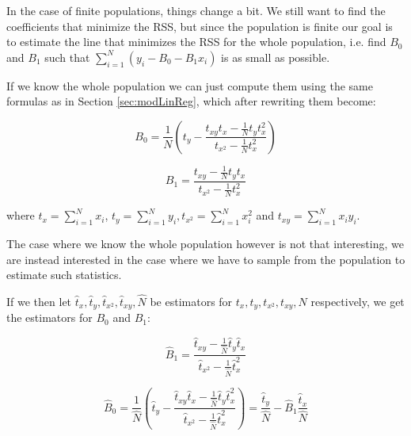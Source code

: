 \documentclass{article}
\begin{document}
In the case of finite populations, things change a bit. We still want to find the
coefficients that minimize the RSS, but since the population is finite our goal
is to estimate the line that minimizes the RSS for the whole population, i.e. find
\(B_0\) and \(B_1\) such that \(\sum_{i = 1}^N (y_i - B_0 - B_1 x_i)\) is as small as
possible.

If we know the whole population we can just compute them using the same formulas
as in Section \ref{sec:modLinReg}, which after rewriting them become:

\begin{equation*}
  B_0 = \frac{1}{N} \left( t_y - \frac{t_{xy} t_x - \frac{1}{N} t_y t_x^2}
    {t_{x^2} - \frac{1}{N} t_x^2}
   \right)
\end{equation*}

\begin{equation*}
  B_1 = \frac{t_{xy} - \frac{1}{N} t_y t_x}
    {t_{x^2} - \frac{1}{N} t_x^2}
\end{equation*}

where \(t_x = \sum_{i = 1}^N x_i\), \(t_y = \sum_{i = 1}^N y_i, t_{x^2} =
\sum_{i = 1}^N x_i^2\) and \(t_{xy} =
\sum_{i = 1}^N x_i y_i\).


The case where we know the whole population however is not that interesting, we are instead interested in the case where we have to sample from the
population to estimate such statistics.

If we then let \(\hat{t}_x, \hat{t}_y, \hat{t}_{x^2}, \hat{t}_{xy}, \hat{N}\) be estimators
for \(t_x, t_y, t_{x^2},
t_{xy}, N\) respectively, we get the estimators for \(B_0\) and \(B_1\):

\begin{equation*}
  \hat{B}_1 = \frac{\hat{t}_{xy} - \frac{1}{\widehat{N}} \hat{t}_y \hat{t}_x}
    {\hat{t}_{x^2} - \frac{1}{\widehat{N}} \hat{t}_x^2}
\end{equation*}

\begin{equation*}
  \hat{B}_0 = \frac{1}{\widehat{N}} \left( \hat{t}_y - \frac{\hat{t}_{xy} \hat{t}_x - \frac{1}{\widehat{N}} \hat{t}_y \hat{t}_x^2}
    {\hat{t}_{x^2} - \frac{1}{\widehat{N}} \hat{t}_x^2}
  \right)
  = \frac{\hat{t}_y}{\hat{N}} - \hat{B}_1\frac{\hat{t}_x}{\hat{N}}
\end{equation*}
\end{document}
